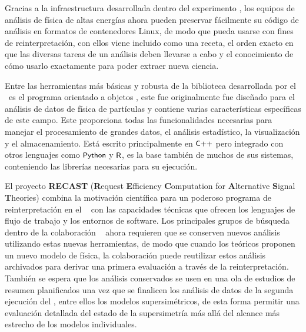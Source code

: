 
Gracias a la infraestructura desarrollada dentro del experimento \CMS, los equipos de análisis de física de altas energías ahora pueden preservar fácilmente su código de análisis en formatos de contenedores Linux, de modo que pueda usarse con fines de reinterpretación, con ellos viene incluido como una receta, el orden exacto en que las diversas tareas de un análisis deben llevarse a cabo y el conocimiento de cómo usarlo exactamente para poder extraer nueva ciencia.

Entre las herramientas más básicas y robusta de la biblioteca desarrollada por el \CERN ~es el programa orientado a objetos \ROOT, este fue originalmente fue diseñado para el análisis de datos de física de partículas y contiene varias características específicas de este campo. Este proporciona todas las funcionalidades necesarias para manejar el procesamiento de grandes datos, el análisis estadístico, la visualización y el almacenamiento. Está escrito principalmente en $\textsf{\small C{++}}$ pero integrado con otros lenguajes como $\textsf{\small Python}$ y $\textsf{\small R}$, es la base también de muchos de sus sistemas, conteniendo las librerías necesarias para su ejecución.

El proyecto \textbf{RECAST} (\textbf{R}equest \textbf{E}fficiency \textbf{C}omputation for \textbf{A}lternative \textbf{S}ignal \textbf{T}heo\-ries) combina la motivación científica para un poderoso programa de reinterpretación en el \LHC ~ con las capacidades técnicas que ofrecen los lenguajes de flujo de trabajo y los entornos de software. Los principales grupos de búsqueda dentro de la colaboración \LHC~ ahora requieren que se conserven nuevos análisis utilizando estas nuevas herramientas, de modo que cuando los teóricos proponen un nuevo modelo de física, la colaboración puede reutilizar estos análisis archivados para derivar una primera evaluación a través de la reinterpretación. También se espera que los análisis conservados se usen en una ola de estudios de resumen planificados una vez que se finalicen los análisis de datos de la segunda ejecución del \LHC, entre ellos los modelos supersimétricos, %
de esta forma permitir una evaluación detallada del estado de la supersimetría más allá del alcance más estrecho de los modelos individuales. 



